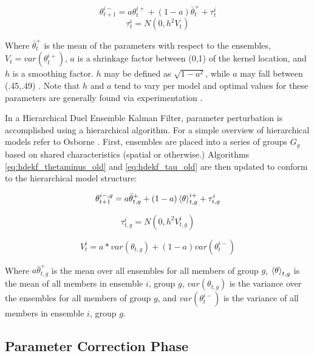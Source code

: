 \begin{equation}\label{eq:hdekf_thetaminus_old}
\theta_{t+1}^{i-} = a\theta_{t}^{i+} + (1-a)\bar{\theta}_{t}^{+} + \tau_{t}^{i}
\end{equation}
\begin{equation}\label{eq:hdekf_tau_old}
\tau_{t}^{i} = N(0, h^{2}V_{t})
\end{equation}

Where $\bar{\theta}_{t}^{+}$ is the mean of the parameters with respect to the ensembles, $V_{t} = var(\theta_{t}^{i+})$, $a$ is a shrinkage factor between (0,1) of the kernel location, and $h$ is a smoothing factor. $h$ may be defined as $\sqrt{1-a^{2}}$, while $a$ may fall between (.45,.49)  \cite{Chen2008}. Note that $h$ and $a$ tend to vary per model and optimal values for these parameters are generally found via experimentation  \cite{Moradkhani2005}  \cite{Anderson1999} \cite{Annan2005} \cite{Chen2008}.

In a Hierarchical Duel Ensemble Kalman Filter, parameter perturbation is accomplished using a hierarchical algorithm. For a simple overview of hierarchical models refer to Osborne \cite{Osborne2000}. First, ensembles are placed into a series of groups $G_{g}$ based on shared characteristics (spatial or otherwise.) Algorithms \eqref{eq:hdekf_thetaminus_old} and \eqref{eq:hdekf_tau_old} are then updated to conform to the hierarchical model structure:

\begin{equation}\label{eq:hdekf_theta}
\theta_{t+1}^{i-,g} = a \bar{\theta}_{t,g}^{+} + (1-a)\braket{\theta}_{t,g}^{i+} + \tau_{t,g}^{i}
\end{equation}

\begin{equation}\label{eq:hdekf_tau}
\tau_{t,g}^{i} = N(0, h^{2}V_{t,g}^{i})
\end{equation}

\begin{equation}\label{eq:hddekf_V}
V_{t}^{i} = a * var(\theta_{t,g}) + (1-a) var(\theta_{t}^{i-})
\end{equation}

Where $a \bar{\theta}_{t,g}^{+}$ is the mean over all ensembles for all members of group $g$, $\braket{\theta}_{t,g}$ is the mean of all members in ensemble $i$, group $g$, $var(\theta_{t,g})$ is the variance over the ensembles for all members of group $g$, and $var(\theta_{t}^{i-})$ is the variance of all members in ensemble $i$, group $g$.

\subsection{Parameter Correction Phase}

